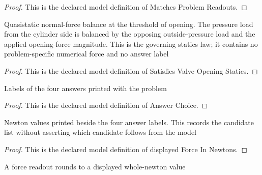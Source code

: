 \begin{proof}
  This is the declared model definition of Matches Problem Readouts.
\end{proof}
\begin{definition}
  \label{def:physics:phyx-mini-0661:phyxminiproblems-problemphyxmini0661-satisfiesvalveopeningstatics}
  Quasistatic normal-force balance at the threshold of opening. The pressure load from the cylinder side is balanced by the opposing outside-pressure load and the applied opening-force magnitude. This is the governing statics law; it contains no problem-specific numerical force and no answer label
\end{definition}
\begin{proof}
  This is the declared model definition of Satisfies Valve Opening Statics.
\end{proof}
\begin{definition}
  \label{def:physics:phyx-mini-0661:phyxminiproblems-problemphyxmini0661-answerchoice}
  Labels of the four answers printed with the problem
\end{definition}
\begin{proof}
  This is the declared model definition of Answer Choice.
\end{proof}
\begin{definition}
  \label{def:physics:phyx-mini-0661:phyxminiproblems-problemphyxmini0661-displayedforceinnewtons}
  Newton values printed beside the four answer labels. This records the candidate list without asserting which candidate follows from the model
\end{definition}
\begin{proof}
  This is the declared model definition of displayed Force In Newtons.
\end{proof}
\begin{definition}
  \label{def:physics:phyx-mini-0661:phyxminiproblems-problemphyxmini0661-roundstonearestnewton}
  A force readout rounds to a displayed whole-newton value
\end{definition}
